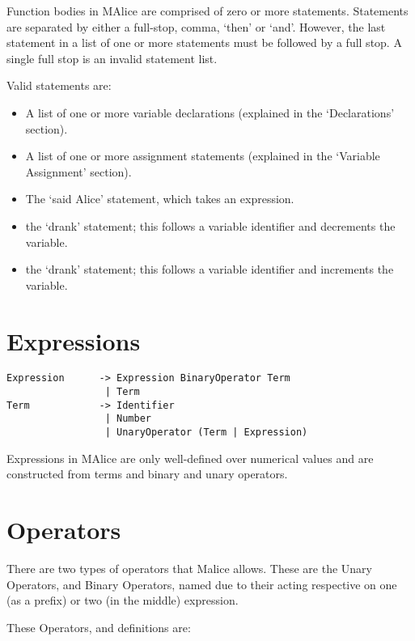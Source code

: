 \documentclass[a4wide, 11pt]{article}
\begin{document}
Function bodies in MAlice are comprised of zero or more statements. Statements are separated by either a full-stop, comma, `then' or `and'. However, the last statement in a list of one or more statements must be followed by a full stop. A single full stop is an invalid statement list.

Valid statements are:
\begin{itemize}

\item A list of one or more variable declarations (explained in the `Declarations' section).
\item A list of one or more assignment statements (explained in the `Variable Assignment' section).
\item The `said Alice' statement, which takes an expression.
\item the `drank' statement; this follows a variable identifier and decrements the variable.
\item the `drank' statement; this follows a variable identifier and increments the variable.

\end{itemize}
  
\section{Expressions}

\begin{verbatim}
Expression      -> Expression BinaryOperator Term
                 | Term
Term            -> Identifier
                 | Number
                 | UnaryOperator (Term | Expression)
\end{verbatim}

Expressions in MAlice are only well-defined over numerical values and are constructed from terms and binary and unary operators.

\section{Operators}

There are two types of operators that Malice allows. These are the Unary Operators, and Binary Operators, named due to their acting respective on one (as a prefix) or two (in the middle) expression.

These Operators, and definitions are:
\end{document}
